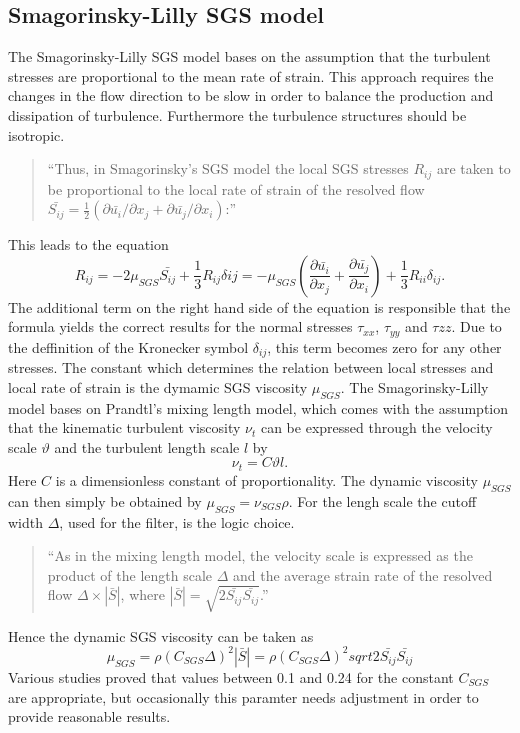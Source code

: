 \subsection{Smagorinsky-Lilly SGS model}
The Smagorinsky-Lilly SGS model bases on the assumption that the turbulent stresses are proportional to the mean rate of strain. This approach requires the changes in the flow direction to be slow in order to balance the production and dissipation of turbulence. Furthermore the turbulence structures should be isotropic.
\begin{quote}
``Thus, in Smagorinsky's SGS model the local SGS stresses $R_{ij}$ are taken to be proportional to the local rate of strain of the resolved flow $\bar{S_{ij}} = \frac{1}{2}(\partial \bar{u_i}/\partial x_j + \partial \bar{u_j}/\partial x_i)$:''
\end{quote}
This leads to the equation
\begin{equation}
R_{ij} = -2 \mu_{SGS} \bar{S_{ij}} + \frac{1}{3} R_{ij} \delta{ij} = -\mu_{SGS} \left( \frac{\partial \bar{u_i}}{\partial x_j} + \frac{\partial \bar{u_j}}{\partial x_i} \right) + \frac{1}{3} R_{ii} \delta_{ij}.
\end{equation}
The additional term on the right hand side of the equation is responsible that the formula yields the correct results for the normal stresses $\tau_{xx}$, $\tau_{yy}$ and $\tau{zz}$. Due to the deffinition of the Kronecker symbol $\delta_{ij}$, this term becomes zero for any other stresses. The constant which determines the relation between local stresses and local rate of strain is the dymamic SGS viscosity $\mu_{SGS}$.
The Smagorinsky-Lilly model bases on Prandtl's mixing length model, which comes with the assumption that the kinematic turbulent viscosity $\nu_t$ can be expressed through the velocity scale $\vartheta$ and the turbulent length scale $l$ by
\begin{equation}
\nu_t = C \vartheta l .
\end{equation}
Here $C$ is a dimensionless constant of proportionality. The dynamic viscosity $\mu_{SGS}$ can then simply be obtained by $\mu_{SGS} = \nu_{SGS} \rho$. For the lengh scale the cutoff width $\Delta$, used for the filter, is the logic choice.
\begin{quote}
``As in the mixing length model, the velocity scale is expressed as the product of the length scale $\Delta$ and the average strain rate of the resolved flow $\Delta \times |\bar{S}|$, where $|\bar{S}| = \sqrt{2 \bar{S_{ij}} \bar{S_{ij}}}$.''
\end{quote}
Hence the dynamic SGS viscosity can be taken as
\begin{equation}
\mu_{SGS} = \rho (C_{SGS} \Delta)^2 |\bar{S}| = \rho(C_{SGS} \Delta)^2 sqrt{2 \bar{S_{ij}} \bar{S_{ij}}}
\end{equation}
Various studies proved that values between 0.1 and 0.24 for the constant $C_{SGS}$ are appropriate, but occasionally this paramter needs adjustment in order to provide reasonable results.
